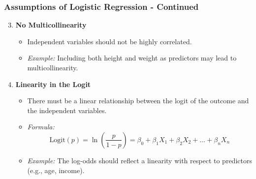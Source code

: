 \documentclass[aspectratio=169]{beamer}
\begin{document}
\begin{frame}[fragile]
    \frametitle{Assumptions of Logistic Regression - Continued}
    \begin{enumerate}
        \setcounter{enumi}{2} %
        \item \textbf{No Multicollinearity}
            \begin{itemize}
                \item Independent variables should not be highly correlated.
                \item \textit{Example:} Including both height and weight as predictors may lead to multicollinearity.
            \end{itemize}
        \item \textbf{Linearity in the Logit}
            \begin{itemize}
                \item There must be a linear relationship between the logit of the outcome and the independent variables.
                \item \textit{Formula:} 
                \[
                \text{Logit}(p) = \ln\left(\frac{p}{1-p}\right) = \beta_0 + \beta_1X_1 + \beta_2X_2 + \ldots + \beta_nX_n
                \]
                \item \textit{Example:} The log-odds should reflect a linearity with respect to predictors (e.g., age, income).
            \end{itemize}
    \end{enumerate}
\end{frame}
\end{document}
